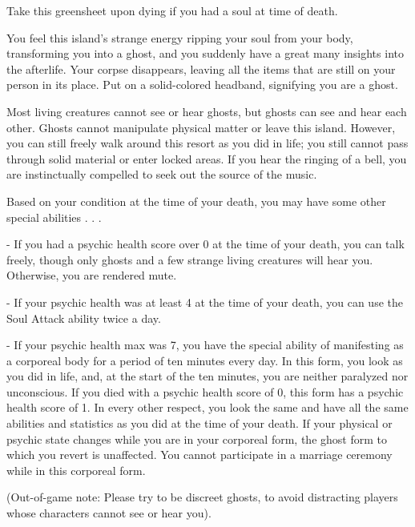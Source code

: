 \documentclass[green]{Kos}
\begin{document}
\name{\gGhost{}}

Take this greensheet upon dying if you had a soul at time of death.

You feel this island's strange energy ripping your soul from your body, transforming you into a ghost, and you suddenly have a great many insights into the afterlife. Your corpse disappears, leaving all the items that are still on your person in its place. Put on a solid-colored headband, signifying you are a ghost.

Most living creatures cannot see or hear ghosts, but ghosts can see and hear each other. Ghosts cannot manipulate physical matter or leave this island. However, you can still freely walk around this resort as you did in life; you still cannot pass through solid material or enter locked areas. If you hear the ringing of a bell, you are instinctually compelled to seek out the source of the music. 

Based on your condition at the time of your death, you may have some other special abilities . . . 

- If you had a psychic health score over 0 at the time of your death, you can talk freely, though only ghosts and a few strange living creatures will hear you. Otherwise, you are rendered mute.

- If your psychic health was at least 4 at the time of your death, you can use the Soul Attack ability twice a day. 

- If your psychic health max was 7, you have the special ability of manifesting as a corporeal body for a period of ten minutes every day. In this form, you look as you did in life, and, at the start of the ten minutes, you are neither paralyzed nor unconscious. If you died with a psychic health score of 0, this form has a psychic health score of 1. In every other respect, you look the same and have all the same abilities and statistics as you did at the time of your death. If your physical or psychic state changes while you are in your corporeal form, the ghost form to which you revert is unaffected. You cannot participate in a marriage ceremony while in this corporeal form.

(Out-of-game note: Please try to be discreet ghosts, to avoid distracting players whose characters cannot see or hear you).
\end{document}

